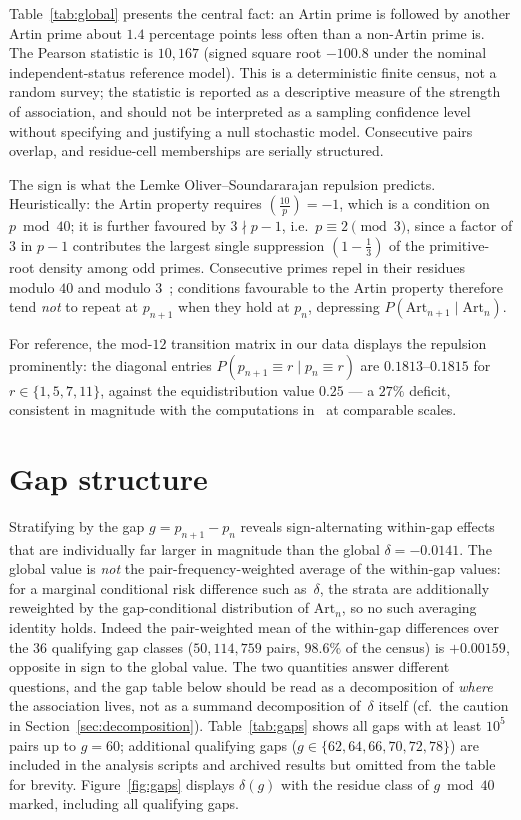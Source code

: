 \documentclass[11pt]{amsart}
\theoremstyle{definition}
\newcommand{\Lsym}[2]{\left(\tfrac{#1}{#2}\right)}
\newcommand{\Art}{\mathrm{Art}}
\begin{document}
Table~\ref{tab:global} presents the central fact: an Artin prime is followed by
another Artin prime about $1.4$ percentage points less often than a non-Artin
prime is. The Pearson statistic is $10{,}167$ (signed square root $-100.8$ under
the nominal independent-status reference model). This is a deterministic finite
census, not a random survey; the statistic is reported as a descriptive measure
of the strength of association, and should not be interpreted as a sampling
confidence level without specifying and justifying a null stochastic model.
Consecutive pairs overlap, and residue-cell memberships are serially structured.

The sign is what the Lemke Oliver--Soundararajan repulsion predicts.
Heuristically: the Artin property requires $\Lsym{10}{p} = -1$, which is a
condition on $p \bmod 40$; it is further favoured by $3 \nmid p - 1$, i.e.\
$p \equiv 2 \pmod 3$, since a factor of $3$ in $p-1$ contributes the largest
single suppression $(1 - \tfrac13)$ of the primitive-root density among odd
primes. Consecutive primes repel in their residues modulo $40$ and modulo
$3$~\cite{LOS2016}; conditions favourable to the Artin property therefore tend
\emph{not} to repeat at $p_{n+1}$ when they hold at $p_n$, depressing
$P(\Art_{n+1} \mid \Art_n)$.

For reference, the mod-$12$ transition matrix in our data displays the
repulsion prominently: the diagonal entries
$P(p_{n+1} \equiv r \mid p_n \equiv r)$ are $0.1813$--$0.1815$ for
$r \in \{1, 5, 7, 11\}$, against the equidistribution value $0.25$ --- a
$27\%$ deficit, consistent in magnitude with the computations
in~\cite{LOS2016} at comparable scales.

\section{Gap structure}
\label{sec:gaps}

Stratifying by the gap $g = p_{n+1} - p_n$ reveals sign-alternating
within-gap effects that are individually far larger in magnitude than the
global $\delta = -0.0141$. The global value is \emph{not} the
pair-frequency-weighted average of the within-gap values: for a marginal
conditional risk difference such as~$\delta$, the strata are additionally
reweighted by the gap-conditional distribution of $\Art_n$, so no such
averaging identity holds. Indeed the pair-weighted mean of the within-gap
differences over the $36$ qualifying gap classes ($50{,}114{,}759$ pairs,
$98.6\%$ of the census) is $+0.00159$, opposite in sign to the global value.
The two quantities answer different questions, and the gap table below should
be read as a decomposition of \emph{where} the association lives, not as a
summand decomposition of~$\delta$ itself (cf.\ the caution in
Section~\ref{sec:decomposition}).
Table~\ref{tab:gaps} shows all gaps with at least $10^5$ pairs up to $g = 60$;
additional qualifying gaps ($g \in \{62, 64, 66, 70, 72, 78\}$) are included
in the analysis scripts and archived results but omitted from the table
for brevity.
Figure~\ref{fig:gaps} displays $\delta(g)$ with the residue class of
$g \bmod 40$ marked, including all qualifying gaps.
\end{document}
